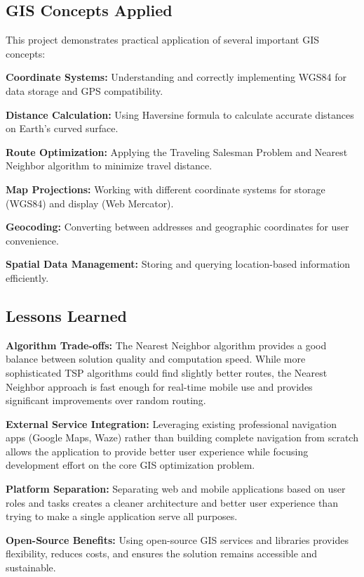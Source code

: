 \documentclass[12pt,a4paper]{article}
\begin{document}
\subsection{GIS Concepts Applied}

This project demonstrates practical application of several important GIS concepts:

\textbf{Coordinate Systems:} Understanding and correctly implementing WGS84 for data storage and GPS compatibility.

\textbf{Distance Calculation:} Using Haversine formula to calculate accurate distances on Earth's curved surface.

\textbf{Route Optimization:} Applying the Traveling Salesman Problem and Nearest Neighbor algorithm to minimize travel distance.

\textbf{Map Projections:} Working with different coordinate systems for storage (WGS84) and display (Web Mercator).

\textbf{Geocoding:} Converting between addresses and geographic coordinates for user convenience.

\textbf{Spatial Data Management:} Storing and querying location-based information efficiently.

\subsection{Lessons Learned}

\textbf{Algorithm Trade-offs:} The Nearest Neighbor algorithm provides a good balance between solution quality and computation speed. While more sophisticated TSP algorithms could find slightly better routes, the Nearest Neighbor approach is fast enough for real-time mobile use and provides significant improvements over random routing.

\textbf{External Service Integration:} Leveraging existing professional navigation apps (Google Maps, Waze) rather than building complete navigation from scratch allows the application to provide better user experience while focusing development effort on the core GIS optimization problem.

\textbf{Platform Separation:} Separating web and mobile applications based on user roles and tasks creates a cleaner architecture and better user experience than trying to make a single application serve all purposes.

\textbf{Open-Source Benefits:} Using open-source GIS services and libraries provides flexibility, reduces costs, and ensures the solution remains accessible and sustainable.
\end{document}
